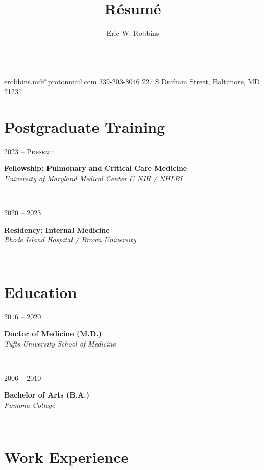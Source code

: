 \documentclass{article}
\title{R\'esum\'e}
\author{Eric W. Robbins}
\date{}
\makeatletter
\newcommand\colleft{.20}
\newcommand\colright{.75}
\newcommand\mohan{Mohan Thanikachalam, MD}
\newcommand{\entryfour}[4]
	{
		\begin{minipage}[t]{\colleft\textwidth}
		\hfill \textsc{#1}
		\end{minipage}
		\hfill\vline\hfill
		\begin{minipage}[t]{\colright\textwidth}
		{\bf#2}\\
		\textit{#3}
		\footnotesize{#4}
		\end{minipage}\\
		\entryvspace
	}%
\newcommand{\entryvspace}{\vspace{0.5em}}
\newcommand{\fellowship}{University of Maryland Medical Center \& NIH / NHLBI}
\newcommand{\residency}{Rhode Island Hospital / Brown University}
\newcommand{\medschool}{Tufts University School of Medicine}
\newcommand{\undergrad}{Pomona College}
\newcommand{\cphone}{339-203-8046}
\newcommand{\address}{227 S Durham Street, Baltimore, MD 21231}
\newcommand{\email}{erobbins.md@protonmail.com}
\renewcommand{\maketitle}{
\begin{center}
	{\huge\bfseries\theauthor}
	\vspace{0.25em}\\
	\email
	\hspace{1em}\vline \hspace{1em}%
	\cphone
	\hspace{1em}\vline \hspace{1em}
	\address
\end{center}
}
\makeatother
\begin{document}
	\maketitle
	
		\section*{Postgraduate Training}
	\entryfour{2023 -- Present}
	{Fellowship: Pulmonary and Critical Care Medicine}
	{\fellowship}
	{}
	
	\entryfour{2020 -- 2023}
	{Residency: Internal Medicine}
	{\residency}
	{}
	
	\section*{Education}
		\entryfour{2016 -- 2020}
			{Doctor of Medicine (M.D.)}
			{\medschool}
			{}%
			
		\entryfour{2006 -- 2010}
		{Bachelor of Arts (B.A.)}
		{\undergrad}
		{}%

	\section*{Work Experience}

		
\end{document}
